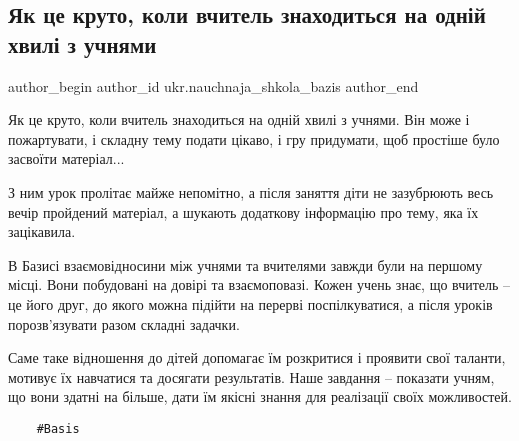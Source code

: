  
 
 
 
 
 
\subsection{Як це круто, коли вчитель знаходиться на одній хвилі з учнями}
\label{sec:18_01_2022.fb.ukr.nauchnaja_shkola_bazis.1.uchitel}
 
\ifcmt
 author_begin
   author_id ukr.nauchnaja_shkola_bazis
 author_end
\fi

Як це круто, коли вчитель знаходиться на одній хвилі з учнями. Він може і
пожартувати, і складну тему подати цікаво, і гру придумати, щоб простіше було
засвоїти матеріал...


З ним урок пролітає майже непомітно, а після заняття діти не зазубрюють весь
вечір пройдений матеріал, а шукають додаткову інформацію про тему, яка їх
зацікавила.

В Базисі взаємовідносини між учнями та вчителями завжди були на першому місці.
Вони побудовані на довірі та взаємоповазі. Кожен учень знає, що вчитель – це
його друг, до якого можна підійти на перерві поспілкуватися, а після уроків
порозв’язувати разом складні задачки.


Саме таке відношення до дітей допомагає їм розкритися і проявити свої таланти,
мотивує їх навчатися та досягати результатів. Наше завдання – показати учням,
що вони здатні на більше, дати їм якісні знання для реалізації своїх
можливостей.

\begin{verbatim}
	#Basis
\end{verbatim}
